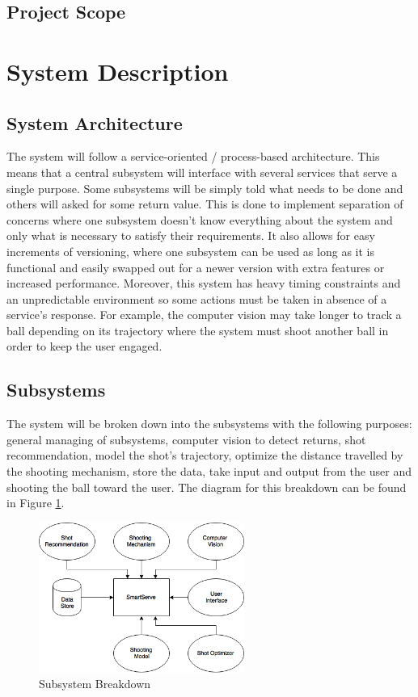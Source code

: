 \documentclass[11pt]{article}
\begin{document}
\subsection{Project Scope}

\section{System Description}
\subsection{System Architecture}
The system will follow a service-oriented / process-based architecture. This means that a central subsystem will interface with several services that serve a single purpose. Some subsystems will be simply told what needs to be done and others will asked for some return value. This is done to implement separation of concerns where one subsystem doesn't know everything about the system and only what is necessary to satisfy their requirements. It also allows for easy increments of versioning, where one subsystem can be used as long as it is functional and easily swapped out for a newer version with extra features or increased performance. Moreover, this system has heavy timing constraints and an unpredictable environment so some actions must be taken in absence of a service's response. For example, the computer vision may take longer to track a ball depending on its trajectory where the system must shoot another ball in order to keep the user engaged.
\subsection{Subsystems}
The system will be broken down into the subsystems with the following purposes: general managing of subsystems, computer vision to detect returns, shot recommendation, model the shot's trajectory, optimize the distance travelled by the shooting mechanism, store the data, take input and output from the user and shooting the ball toward the user. The diagram for this breakdown can be found in Figure \ref{fig:sub}.
\begin{figure}[htbp]
   \centering
   \includegraphics[width=0.6\textwidth]{img/Subsystem.png} %
   \caption{Subsystem Breakdown}
   \label{fig:sub}
\end{figure}
\end{document}
